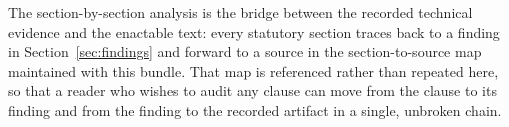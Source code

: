 The section-by-section analysis is the bridge between the recorded technical
evidence and the enactable text: every statutory section traces back to a finding
in Section~\ref{sec:findings} and forward to a source in the section-to-source map
maintained with this bundle. That map is referenced rather than repeated here, so
that a reader who wishes to audit any clause can move from the clause to its
finding and from the finding to the recorded artifact in a single, unbroken
chain.
